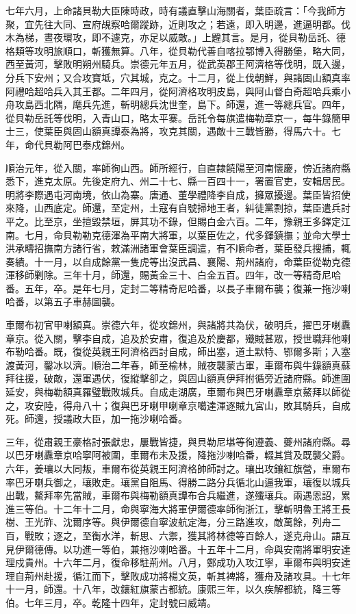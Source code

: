 \begin{pinyinscope}
七年六月，上命諸貝勒大臣陳時政，時有議直擊山海關者，葉臣疏言：「今我師方聚，宜先往大同、宣府覘察哈爾蹤跡，近則攻之；若遠，即入明邊，進逼明都。伐木為梯，晝夜環攻，即不遽克，亦足以威敵。」上韙其言。是月，從貝勒岳託、德格類等攻明旅順口，斬獲無算。八年，從貝勒代善自喀拉鄂博入得勝堡，略大同，西至黃河，擊敗明朔州騎兵。崇德元年五月，從武英郡王阿濟格等伐明，既入邊，分兵下安州；又合攻寶坻，穴其城，克之。十二月，從上伐朝鮮，與諸固山額真率阿禮哈超哈兵入其王都。二年四月，從阿濟格攻明皮島，與阿山督白奇超哈兵乘小舟攻島西北隅，麾兵先進，斬明總兵沈世奎，島下。師還，進一等總兵官。四年，從貝勒岳託等伐明，入青山口，略太平寨。岳託令每旗遣梅勒章京一，每牛錄簡甲士三，使葉臣與固山額真譚泰為將，攻克其關，遇敵十三戰皆勝，得馬六十。七年，命代貝勒阿巴泰戍錦州。

順治元年，從入關，率師徇山西。師所經行，自直隸饒陽至河南懷慶，傍近諸府縣悉下，進克太原。先後定府九、州二十七、縣一百四十一，署置官吏，安輯居民。明將李際遇屯河南境，依山為寨。唐通、董學禮降李自成，擁眾擾邊。葉臣皆招使來降，山西底定。師還，至定州，土寇有自號掃地王者，糾徒黨剽掠，葉臣遣兵討平之。比至京，坐擅毀禁垣，屏其功不錄，但賜白金六百。二年，豫親王多鐸定江南。七月，命貝勒勒克德渾為平南大將軍，以葉臣佐之，代多鐸鎮撫；並命大學士洪承疇招撫南方諸行省，敕滿洲諸軍會葉臣調遣，有不順命者，葉臣發兵搜捕，輒奏績。十一月，以自成餘黨一隻虎等出沒武昌、襄陽、荊州諸府，命葉臣從勒克德渾移師剿除。三年十月，師還，賜黃金三十、白金五百。四年，改一等精奇尼哈番。五年，卒。是年七月，定封二等精奇尼哈番，以長子車爾布襲；復兼一拖沙喇哈番，以第五子車赫圖襲。

車爾布初官甲喇額真。崇德六年，從攻錦州，與諸將共為伏，破明兵，擢巴牙喇纛章京。從入關，擊李自成，追及於安肅，復追及於慶都，殲賊甚眾，授世職拜他喇布勒哈番。既，復從英親王阿濟格西討自成，師出塞，道土默特、鄂爾多斯；入塞渡黃河，鑿冰以濟。順治二年春，師至榆林，賊夜襲蒙古軍，車爾布與牛錄額真蘇拜往援，破敵，還軍遇伏，復縱擊卻之，與固山額真伊拜拊循旁近諸府縣。師進圍延安，與梅勒額真羅璧戰敗城兵。自成走湖廣，車爾布與巴牙喇纛章京鰲拜以師從之，攻安陸，得舟八十；復與巴牙喇甲喇章京噶達渾逐賊九宮山，敗其騎兵，自成死。師還，授議政大臣，加一拖沙喇哈番。

三年，從肅親王豪格討張獻忠，屢戰皆捷，與貝勒尼堪等徇遵義、夔州諸府縣。尋以巴牙喇纛章京哈寧阿被圍，車爾布未及援，降拖沙喇哈番，輟其賞及既襲父爵。六年，姜瓖以大同叛，車爾布從英親王阿濟格帥師討之。瓖出攻鑲紅旗營，車爾布率巴牙喇兵御之，瓖敗走。瓖黨自阻馬、得勝二路分兵循北山逼我軍，瓖復以城兵出戰，鰲拜率先當賊，車爾布與梅勒額真譚布合兵繼進，遂殲瓖兵。兩遇恩詔，累進三等伯。十二年十二月，命與寧海大將軍伊爾德率師徇浙江，擊斬明魯王將王長樹、王光祚、沈爾序等。與伊爾德自寧波航定海，分三路進攻，敵萬餘，列舟二百，戰敗；逐之，至衡水洋，斬思、六禦，獲其將林德等百餘人，遂克舟山。語互見伊爾德傳。以功進一等伯，兼拖沙喇哈番。十五年十二月，命與安南將軍明安達理戍貴州。十六年二月，復命移駐荊州。八月，鄭成功入攻江寧，車爾布與明安達理自荊州赴援，循江而下，擊敗成功將楊文英，斬其裨將，獲舟及諸攻具。十七年十一月，師還。十八年，改鑲紅旗蒙古都統。康熙三年，以久疾解都統，降三等伯。七年三月，卒。乾隆十四年，定封號曰威靖。


\end{pinyinscope}
